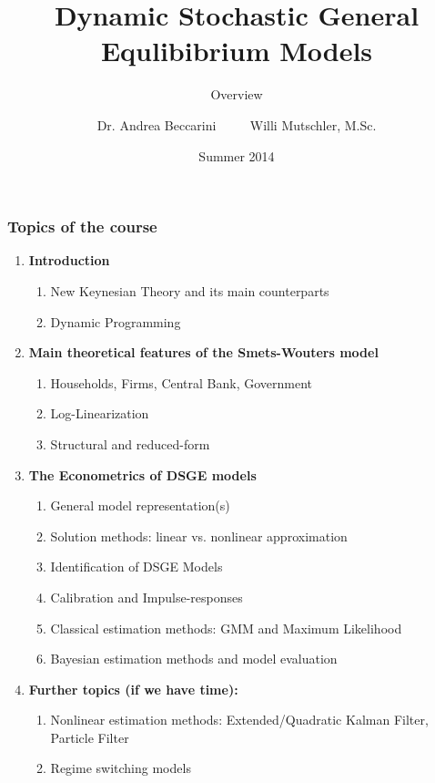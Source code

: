 \documentclass{beamer} %
\begin{document}
\author[Beccarini/Mutschler]{Dr. Andrea Beccarini $\qquad$ Willi Mutschler, M.Sc.}
\date{Summer 2014}
\title[DSGE]{Dynamic Stochastic General Equlibibrium Models}
\subtitle{Overview}

\begin{frame}
\titlepage
\end{frame}

\begin{frame}\frametitle{Topics of the course}
\begin{enumerate}
\item \textbf{Introduction}
	\begin{enumerate}
	\item New Keynesian Theory and its main counterparts
	\item Dynamic Programming
	\end{enumerate}
\item \textbf{Main theoretical features of the Smets-Wouters model}
	\begin{enumerate}
	\item Households, Firms, Central Bank, Government
	\item Log-Linearization
	\item Structural and reduced-form
	\end{enumerate}
\item \textbf{The Econometrics of DSGE models}
	\begin{enumerate}
	\item General model representation(s)
	\item Solution methods: linear vs. nonlinear approximation
	\item Identification of DSGE Models
	\item Calibration and Impulse-responses
	\item Classical estimation methods: GMM and Maximum Likelihood
	\item Bayesian estimation methods and model evaluation
	\end{enumerate}
\item \textbf{Further topics (if we have time):} 
	\begin{enumerate}
		\item Nonlinear estimation methods: Extended/Quadratic Kalman Filter, Particle Filter
		\item Regime switching models
	\end{enumerate}
\end{enumerate}
\end{frame}
\end{document}
